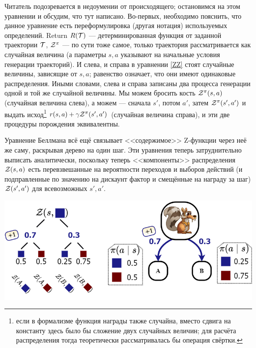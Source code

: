 Читатель подозревается в недоумении от происходящего; остановимся на этом уравнении и обсудим, что тут написано. Во-первых, необходимо пояснить, что данное уравнение есть переформулировка (другая нотация) используемых определений. Return $R(\mathcal{T})$ --- детерминированная функция от заданной траектории $\mathcal{T}$, $\mathcal{Z}^\pi$ --- по сути тоже самое, только траектория рассматривается как случайная величина (а параметры $s, a$ указывают на начальные условия генерации траекторий). И слева, и справа в уравнении \eqref{ZZ} стоят случайные величины, зависящие от $s, a$; равенство означает, что они имеют одинаковые распределения. Иными словами, слева и справа записаны два процесса генерации одной и той же случайной величины. Мы можем бросить кость $\mathcal{Z}^\pi(s, a)$ (случайная величина слева), а можем --- сначала $s'$, потом $a'$, затем $\mathcal{Z}^\pi(s', a')$ и выдать исход\footnote{если в формализме функция награды также случайна, вместо сдвига на константу здесь было бы сложение двух случайных величин; для расчёта распределения тогда теоретически рассматривалась бы операция свёртки.} $r(s, a) \HM+ \gamma \Z^\pi(s', a')$ (случайная величина справа), и эти две процедуры порождения эквивалентны. 

\begin{exampleBox}[righthand ratio=0.55, sidebyside, sidebyside align=center, lower separated=false]{}
Уравнение Беллмана всё ещё связывает <<содержимое>> Z-функции через неё же саму, раскрывая дерево на один шаг. Эти уравнения теперь затруднительно выписать аналитически, поскольку теперь <<компоненты>> распределения $\mathcal{Z}(s, a)$ есть перевзвешанные на вероятности переходов и выборов действий (и подправленные по значению на дискаунт фактор и смещённые на награду за шаг) $\mathcal{Z}(s', a')$ для всевозможных $s', a'$.

\tcblower
\begin{adjustwidth}{-0.85cm}{}
\includegraphics[width=1.1\textwidth]{Images/DistributionalBellmanExample.png}
\end{adjustwidth}
\end{exampleBox}

